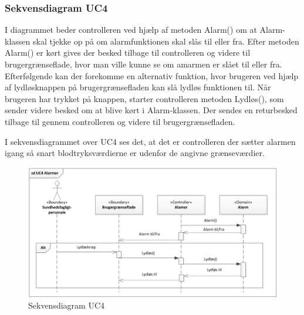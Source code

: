 \subsubsection{Sekvensdiagram UC4}
I diagrammet beder controlleren ved hjælp af metoden Alarm() om at Alarm-klassen skal tjekke op på om alarmfunktionen skal slås til eller fra. Efter metoden Alarm() er kørt gives der besked tilbage til controlleren og videre til brugergrænseflade, hvor man ville kunne se om amarmen er slået til eller fra.
Efterfølgende kan der forekomme en alternativ funktion, hvor brugeren ved hjælp af lydløsknappen på brugergrænsefladen kan slå lydløs funktionen til. Når brugeren har trykket på knappen, starter controlleren metoden Lydløs(), som sender videre besked om at blive kørt i Alarm-klassen. Der sendes en returbesked tilbage til gennem controlleren og videre til brugergrænsefladen.

I sekvensdiagrammet over UC4 ses det, at det er controlleren der sætter alarmen igang så snart blodtryksværdierne er udenfor de angivne grænseværdier. 
\begin{figure}[H]
\centering
\includegraphics[scale=0.70]{sd4.PNG}
\caption{Sekvensdiagram UC4}
\end{figure}

